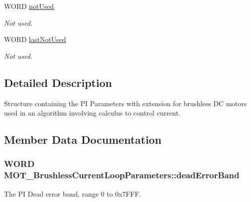 \begin{DoxyCompactItemize}
W\+O\+RD \hyperlink{struct_m_o_t___brushless_current_loop_parameters_a142029ee84ecba693007041add3c6681}{not\+Used}
\begin{DoxyCompactList}\small\item\em Not used. \end{DoxyCompactList}\item 
W\+O\+RD \hyperlink{struct_m_o_t___brushless_current_loop_parameters_abd7a949f35b0953df8142191aa51c99e}{last\+Not\+Used}
\begin{DoxyCompactList}\small\item\em Not used. \end{DoxyCompactList}\end{DoxyCompactItemize}


\subsection{Detailed Description}
Structure containing the PI Parameters with extension for brushless DC motors used in an algorithm involving calculus to control current. 



\subsection{Member Data Documentation}
\subsubsection[{\texorpdfstring{dead\+Error\+Band}{deadErrorBand}}]{\setlength{\rightskip}{0pt plus 5cm}W\+O\+RD M\+O\+T\+\_\+\+Brushless\+Current\+Loop\+Parameters\+::dead\+Error\+Band}\hypertarget{struct_m_o_t___brushless_current_loop_parameters_ac7bbd26dcb62055c57288e390483c2d9}{}\label{struct_m_o_t___brushless_current_loop_parameters_ac7bbd26dcb62055c57288e390483c2d9}


The PI Dead error band, range 0 to 0x7\+F\+FF. 

